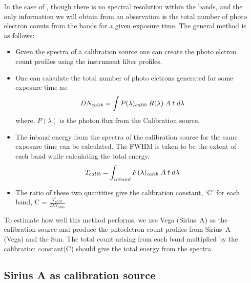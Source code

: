 In the case of \suit, though there is no spectral resolution within the bands, and the only information we will obtain from an observation is the total number of photo electron counts from the bands for a given exposure time. The general method is as follows:

\begin{itemize}
    \item Given the spectra of a calibration source one can create the photo elctron count profiles using the instrument filter profiles.
    
    \item One can calculate the total number of photo elctrons generated for some exposure time as:
    \begin{equation*}
        DN_{calib} = \int P(\lambda)_{calib\hspace{0.1cm}}R(\lambda)\hspace{0.1cm}A\hspace{0.1cm}t\hspace{0.1cm} d\lambda
    \end{equation*}
    \noindent where, $P(\lambda)$ is the photon flux from the Calibration source.
    
    \item The inband energy from the spectra of the calibration source for the same exposure time can be calculated. The FWHM is taken to be the extent of each band while calculating the total energy.
    \begin{equation*}
        T_{calib} = \int_{inband} F(\lambda)_{calib}\hspace{0.1cm} A\hspace{0.1cm}t\hspace{0.1cm} d\lambda
    \end{equation*}
    \item The ratio of these two quantities give the calibration constant, `C' for each band, C = $\frac{T_{calib}}{DN_{calib}}$
\end{itemize}

To estimate how well this method performs, we use Vega (Sirius~A) as the calibration source and produce the phtoelctron count profiles from Sirius~A (Vega) and the Sun. The total count arising from each band multiplied by the calibration constant(C) should give the total energy from the spectra.

\subsection{Sirius A as calibration source}\label{sirius}

